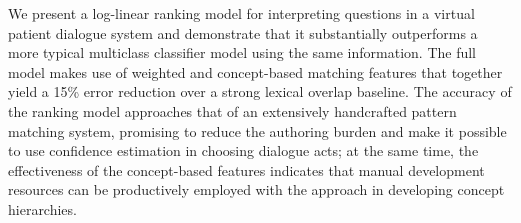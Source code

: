 We present a log-linear ranking model for interpreting questions in a virtual patient dialogue system and demonstrate that it substantially outperforms a more typical multiclass classifier model using the same information. The full model makes use of weighted and concept-based matching features that together yield a 15\% error reduction over a strong lexical overlap baseline. The accuracy of the ranking model approaches that of an extensively handcrafted pattern matching system, promising to reduce the authoring burden and make it possible to use confidence estimation in choosing dialogue acts; at the same time, the effectiveness of the concept-based features indicates that manual development resources can be productively employed with the approach in developing concept hierarchies.
